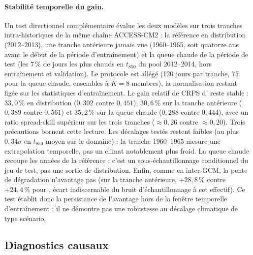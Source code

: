 \paragraph{Stabilité temporelle du gain.} Un test directionnel complémentaire évalue les deux modèles sur trois tranches intra-historiques de la même chaîne ACCESS-CM2 : la référence en distribution (2012--2013), une tranche antérieure jamais vue (1960--1965, soit quatorze ans avant le début de la période d'entraînement) et la queue chaude de la période de test (les $7\,\%$ de jours les plus chauds en $t_{850}$ du pool 2012--2014, hors entraînement et validation). Le protocole est allégé (120 jours par tranche, 75 pour la queue chaude, ensembles à $K=8$ membres), la normalisation restant figée sur les statistiques d'entraînement. Le gain relatif de CRPS d'\Oracle{} reste stable : $33{,}0\,\%$ en distribution ($0{,}302$ contre $0{,}451$), $30{,}6\,\%$ sur la tranche antérieure ($0{,}389$ contre $0{,}561$) et $35{,}2\,\%$ sur la queue chaude ($0{,}288$ contre $0{,}444$), avec un ratio spread-skill supérieur sur les trois tranches ($\approx 0{,}26$ contre $\approx 0{,}20$). Trois précautions bornent cette lecture. Les décalages testés restent faibles (au plus $0{,}34\sigma$ en $t_{850}$ moyen sur le domaine) : la tranche 1960--1965 mesure une extrapolation temporelle, pas un climat notablement plus froid. La queue chaude recoupe les années de la référence : c'est un sous-échantillonnage conditionnel du jeu de test, pas une sortie de distribution. Enfin, comme en inter-GCM, la pente de dégradation n'avantage pas \Oracle{} (sur la tranche antérieure, $+28{,}8\,\%$ contre $+24{,}4\,\%$ pour \CorrDiff{}, écart indiscernable du bruit d'échantillonnage à cet effectif). Ce test établit donc la persistance de l'avantage hors de la fenêtre temporelle d'entraînement ; il ne démontre pas une robustesse au décalage climatique de type scénario.

\subsection{Diagnostics causaux}
\label{ssec:exp-res-causal}

